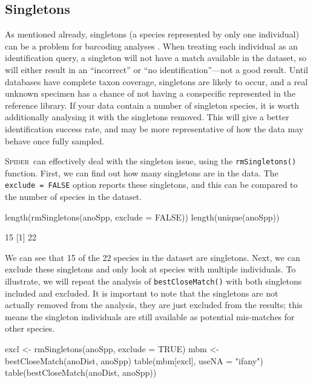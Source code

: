 \documentclass{article}
\newcommand{\Spider}{\textsc{Spider}} %
\newcommand{\fun}[1]{\texttt{#1}}
\begin{document}
\subsection{Singletons}

As mentioned already, singletons (a species represented by only one individual) can be a problem for barcoding analyses \citep{Lim2011}. When treating each individual as an identification query, a singleton will not have a match available in the dataset, so will either result in an ``incorrect'' or ``no identification''---not a good result. Until databases have complete taxon coverage, singletons are likely to occur, and a real unknown specimen has a chance of not having a conspecific represented in the reference library. If your data contain a number of singleton species, it is worth additionally analysing it with the singletons removed. This will give a better identification success rate, and may be more representative of how the data may behave once fully sampled.

\Spider~can effectively deal with the singleton issue, using the \fun{rmSingletons()} function. First, we can find out how many singletons are in the data. The \fun{exclude = FALSE} option reports these singletons, and this can be compared to the number of species in the dataset.

\begin{console}
length(rmSingletons(anoSpp, exclude = FALSE))
length(unique(anoSpp))
\end{console}


\begin{Routput}
[1] 15
[1] 22
\end{Routput}


We can see that 15 of the 22 species in the dataset are singletons. Next, we can exclude these singletons and only look at species with multiple individuals. To illustrate, we will repeat the analysis of \fun{bestCloseMatch()} with both singletons included and excluded. It is important to note that the singletons are not actually removed from the analysis, they are just excluded from the results; this means the singleton individuals are still available as potential mis-matches for other species.

\begin{console}
excl <- rmSingletons(anoSpp, exclude = TRUE)
mbm <- bestCloseMatch(anoDist, anoSpp)
table(mbm[excl], useNA = "ifany")
table(bestCloseMatch(anoDist, anoSpp))
\end{console}
\end{document}
